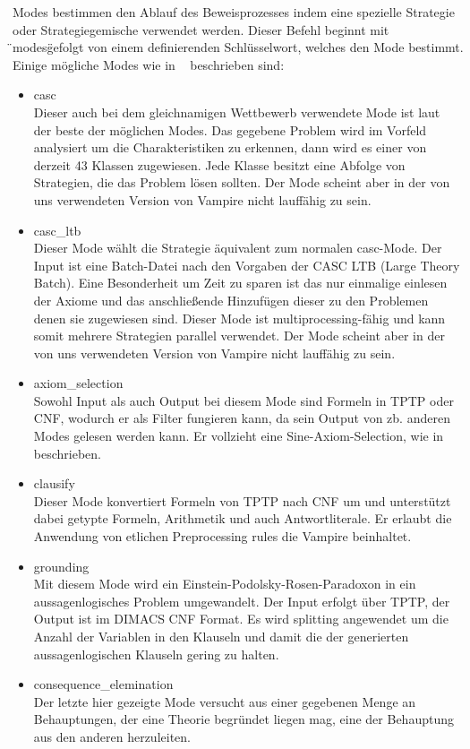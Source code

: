 \documentclass{acm_proc_article-sp-german}
\begin{document}
Modes bestimmen den Ablauf des Beweisprozesses indem eine spezielle Strategie oder Strategiegemische verwendet werden. 
Dieser Befehl beginnt mit \"\-\-modes\" gefolgt von einem definierenden Schlüsselwort, welches den Mode bestimmt.
Einige mögliche Modes wie in ~\cite{hoder2011slides} beschrieben sind:
\begin{itemize}
\item casc \\
		Dieser auch bei dem gleichnamigen Wettbewerb verwendete Mode ist laut ~\cite{hoder2011slides}  der beste der möglichen Modes.
		Das gegebene Problem wird im Vorfeld analysiert um die Charakteristiken zu erkennen, dann wird es einer von derzeit 43 Klassen zugewiesen. Jede Klasse besitzt eine Abfolge von Strategien, die das Problem lösen sollten.
		Der Mode scheint aber in der von uns verwendeten Version von Vampire nicht lauffähig zu sein.\\
\item casc\_ltb \\
		Dieser Mode wählt die Strategie äquivalent zum normalen casc-Mode. Der Input ist eine Batch-Datei nach den Vorgaben der CASC LTB (Large Theory Batch). Eine Besonderheit um Zeit zu sparen ist das nur einmalige einlesen der Axiome und das anschließende Hinzufügen dieser zu den Problemen denen sie zugewiesen sind. Dieser Mode ist multiprocessing-fähig und kann somit mehrere Strategien parallel verwendet.
		Der Mode scheint aber in der von uns verwendeten Version von Vampire nicht lauffähig zu sein.\\
\item axiom\_selection \\
		Sowohl Input als auch Output bei diesem Mode sind Formeln in TPTP oder CNF, wodurch er als Filter fungieren kann, da sein Output von zb. anderen Modes gelesen werden kann.
		Er vollzieht eine Sine-Axiom-Selection, wie in ~\cite{sinquanon} beschrieben.\\
\item clausify \\
		Dieser Mode konvertiert Formeln von TPTP nach CNF um und unterstützt dabei getypte Formeln, Arithmetik und auch Antwortliterale. Er erlaubt die Anwendung von etlichen Preprocessing rules die Vampire beinhaltet. \\
\item grounding \\
		Mit diesem Mode wird ein Einstein-Podolsky-Rosen-Paradoxon in ein aussagenlogisches Problem umgewandelt. Der Input erfolgt über TPTP, der Output ist im DIMACS CNF Format.
		Es wird splitting angewendet um die Anzahl der Variablen in den Klauseln und damit die der generierten aussagenlogischen Klauseln gering zu halten. \\
\item consequence\_elemination \\
		Der letzte hier gezeigte Mode versucht aus einer gegebenen Menge an Behauptungen, der eine Theorie begründet liegen mag, eine der Behauptung aus den anderen herzuleiten.

\end{itemize}
\end{document}
